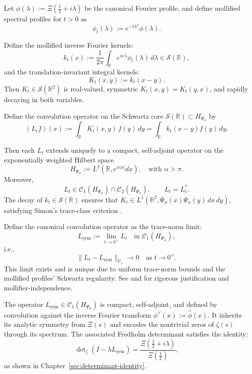 \begin{definition}
\label{def:convolution_operators_Lt_Lsym}
Let \( \phi(\lambda) := \Xi\left( \tfrac{1}{2} + i\lambda \right) \) be the canonical Fourier profile, and define mollified spectral profiles for \( t > 0 \) as
\[
\phi_t(\lambda) := e^{-t\lambda^2} \phi(\lambda).
\]

Define the mollified inverse Fourier kernels:
\[
k_t(x) := \frac{1}{2\pi} \int_{\mathbb{R}} e^{i x \lambda} \phi_t(\lambda)\, d\lambda \in \mathcal{S}(\mathbb{R}),
\]
and the translation-invariant integral kernels:
\[
K_t(x,y) := k_t(x - y).
\]
Then \( K_t \in \mathcal{S}(\mathbb{R}^2) \) is real-valued, symmetric \( K_t(x,y) = K_t(y,x) \), and rapidly decaying in both variables.

Define the convolution operator on the Schwartz core \( \mathcal{S}(\mathbb{R}) \subset H_{\Psi_\alpha} \) by
\[
(L_t f)(x) := \int_{\mathbb{R}} K_t(x,y)\, f(y)\, dy = \int_{\mathbb{R}} k_t(x - y) f(y)\, dy.
\]

Then each \( L_t \) extends uniquely to a compact, self-adjoint operator on the exponentially weighted Hilbert space
\[
H_{\Psi_\alpha} := L^2(\mathbb{R}, e^{\alpha|x|} dx), \quad \text{with } \alpha > \pi.
\]
Moreover,
\[
L_t \in \mathcal{C}_1(H_{\Psi_\alpha}) \cap \mathcal{C}_2(H_{\Psi_\alpha}), \qquad L_t = L_t^*.
\]
The decay of \( k_t \in \mathcal{S}(\mathbb{R}) \) ensures that \( K_t \in L^1(\mathbb{R}^2, \Psi_\alpha(x)\Psi_\alpha(y)\, dx\,dy) \), satisfying Simon’s trace-class criterion \cite[Ch.~4]{Simon2005TraceIdeals}.

\medskip
\noindent
Define the canonical convolution operator as the trace-norm limit:
\[
L_{\mathrm{sym}} := \lim_{t \to 0^+} L_t \quad \text{in } \mathcal{C}_1(H_{\Psi_\alpha}),
\]
i.e.,
\[
\| L_t - L_{\mathrm{sym}} \|_{\mathcal{C}_1} \to 0 \quad \text{as } t \to 0^+.
\]
This limit exists and is unique due to uniform trace-norm bounds and the mollified profiles' Schwartz regularity. See  and  for rigorous justification and mollifier-independence.

\medskip
\noindent
The operator \( L_{\mathrm{sym}} \in \mathcal{C}_1(H_{\Psi_\alpha}) \) is compact, self-adjoint, and defined by convolution against the inverse Fourier transform \( \phi^\vee(x) := \widehat{\phi}(x) \). It inherits its analytic symmetry from \( \Xi(s) \) and encodes the nontrivial zeros of \( \zeta(s) \) through its spectrum. The associated Fredholm determinant satisfies the identity:
\[
\det\nolimits_{\zeta}(I - \lambda L_{\mathrm{sym}}) = \frac{\Xi\left( \tfrac{1}{2} + i\lambda \right)}{\Xi\left( \tfrac{1}{2} \right)},
\]
as shown in Chapter~\ref{sec:determinant-identity}.
\end{definition}
% 